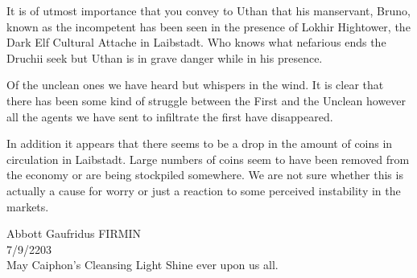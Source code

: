 \documentclass{letter}
\begin{document}
\begin{letter}{}
It is of utmost importance that you convey to Uthan that his manservant, Bruno, known as the incompetent has been seen in the presence of Lokhir Hightower, the Dark Elf Cultural Attache in Laibstadt.  Who knows what nefarious ends the Druchii seek but Uthan is in grave danger while in his presence.

Of the unclean ones we have heard but whispers in the wind.  It is clear that there has been some kind of struggle between the First and the Unclean however all the agents we have sent to infiltrate the first have disappeared.

In addition it appears that there seems to be a drop in the amount of coins in circulation in Laibstadt.   Large numbers of coins seem to have been removed from the economy or are being stockpiled somewhere.   We are not sure whether this is actually a cause for worry or just a reaction to some perceived instability in the markets.


\closing{Abbott Gaufridus FIRMIN \\
7/9/2203\\
May Caiphon's Cleansing Light Shine ever upon us all.}
\end{letter}
\end{document}
